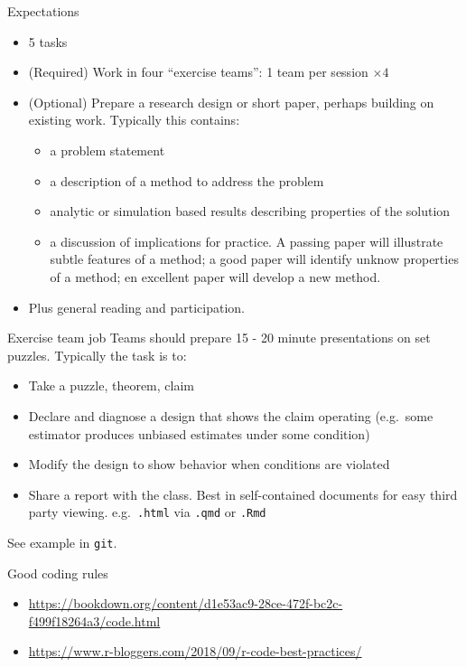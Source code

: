 \documentclass[
  11pt,
  ignorenonframetext,
]{beamer}
\providecommand{\tightlist}{%
  \setlength{\itemsep}{0pt}\setlength{\parskip}{0pt}}\usepackage{longtable,booktabs,array}
\begin{document}
\begin{frame}{Expectations}
\protect\hypertarget{expectations}{}
\begin{itemize}
\tightlist
\item
  5 tasks
\item
  (Required) Work in four ``exercise teams'': 1 team per session
  \(\times 4\)
\item
  (Optional) Prepare a research design or short paper, perhaps building
  on existing work. Typically this contains:

  \begin{itemize}
  \tightlist
  \item
    a problem statement
  \item
    a description of a method to address the problem
  \item
    analytic or simulation based results describing properties of the
    solution
  \item
    a discussion of implications for practice. A passing paper will
    illustrate subtle features of a method; a good paper will identify
    unknow properties of a method; en excellent paper will develop a new
    method.
  \end{itemize}
\item
  Plus general reading and participation.
\end{itemize}
\end{frame}

\begin{frame}[fragile]{Exercise team job}
\protect\hypertarget{exercise-team-job}{}
Teams should prepare 15 - 20 minute presentations on set puzzles.
Typically the task is to:

\begin{itemize}
\item
  Take a puzzle, theorem, claim
\item
  Declare and diagnose a design that shows the claim operating
  (e.g.~some estimator produces unbiased estimates under some condition)
\item
  Modify the design to show behavior when conditions are violated
\item
  Share a report with the class. Best in self-contained documents for
  easy third party viewing. e.g.~\texttt{.html} via \texttt{.qmd} or
  \texttt{.Rmd}
\end{itemize}

See example in \texttt{git}.
\end{frame}

\begin{frame}{Good coding rules}
\protect\hypertarget{good-coding-rules}{}
\begin{itemize}
\tightlist
\item
  \url{https://bookdown.org/content/d1e53ac9-28ce-472f-bc2c-f499f18264a3/code.html}
\item
  \url{https://www.r-bloggers.com/2018/09/r-code-best-practices/}
\end{itemize}
\end{frame}
\end{document}
